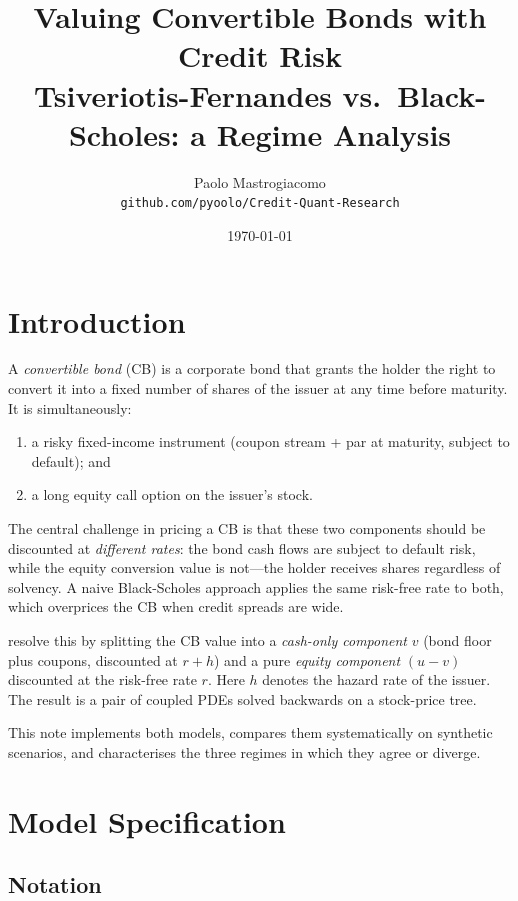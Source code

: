 \documentclass[11pt, a4paper]{article}
\title{\textbf{Valuing Convertible Bonds with Credit Risk}\\
       \large Tsiveriotis-Fernandes vs.\ Black-Scholes: a Regime Analysis}
\author{Paolo Mastrogiacomo \\ \small \texttt{github.com/pyoolo/Credit-Quant-Research}}
\date{\today}
\begin{document}
\maketitle
\tableofcontents
\bigskip

\section{Introduction}

A \emph{convertible bond} (CB) is a corporate bond that grants the
holder the right to convert it into a fixed number of shares of the
issuer at any time before maturity.  It is simultaneously:
\begin{enumerate}
  \item a risky fixed-income instrument (coupon stream + par at maturity, subject to default); and
  \item a long equity call option on the issuer's stock.
\end{enumerate}

The central challenge in pricing a CB is that these two components
should be discounted at \emph{different rates}: the bond cash flows
are subject to default risk, while the equity conversion value is
not---the holder receives shares regardless of solvency.  A naive
Black-Scholes approach applies the same risk-free rate to both, which
overprices the CB when credit spreads are wide.

\citet{tf1998} resolve this by splitting the CB value into a
\emph{cash-only component} $v$ (bond floor plus coupons, discounted
at $r+h$) and a pure \emph{equity component} $(u-v)$ discounted at
the risk-free rate $r$.  Here $h$ denotes the hazard rate of the
issuer.  The result is a pair of coupled PDEs solved backwards on a
stock-price tree.

This note implements both models, compares them systematically on
synthetic scenarios, and characterises the three regimes in which
they agree or diverge.

\section{Model Specification}

\subsection{Notation}
\end{document}
